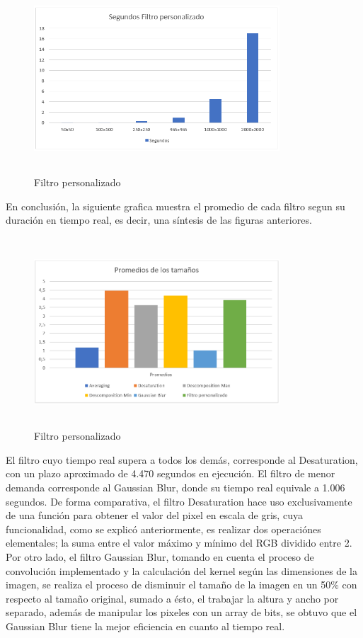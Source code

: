 \documentclass[journal]{IEEEtran}
\begin{document}
\begin{itemize}
	\newpage
	\begin{figure}[h]
		\centering
		\includegraphics[height= 200pt, width=260pt]{msfp.png}
		\caption{Filtro personalizado}
	\end{figure}
	
	En conclusión, la siguiente grafica muestra el promedio de cada filtro segun su duración en tiempo real, es decir, una síntesis de las figuras anteriores.
	
	\begin{figure}[h]
		\centering
		\includegraphics[height= 200pt, width=260pt]{promediosTiempo.png}
		\caption{Filtro personalizado}
	\end{figure}
	
	El filtro cuyo tiempo real supera a todos los demás, corresponde al Desaturation, con un plazo aproximado de 4.470 segundos en ejecución. El filtro de menor demanda corresponde al Gaussian Blur, donde su tiempo real equivale a 1.006 segundos. De forma comparativa, el filtro Desaturation hace uso exclusivamente de una función para obtener el valor del pixel en escala de gris, cuya funcionalidad, como se explicó anteriormente, es realizar dos operaciónes elementales; la suma entre el valor máximo y mínimo del RGB dividido entre 2. Por otro lado, el filtro Gaussian Blur, tomando en cuenta el proceso de convolución implementado y la calculación del kernel según las dimensiones de la imagen, se realiza el proceso de disminuir el tamaño de la imagen en un 50\% con respecto al tamaño original, sumado a ésto, el trabajar la altura y ancho por separado, además de manipular los pixeles con un array de bits, se obtuvo que el Gaussian Blur tiene la mejor eficiencia en cuanto al tiempo real. \\ 



\end{itemize}
\end{document}

